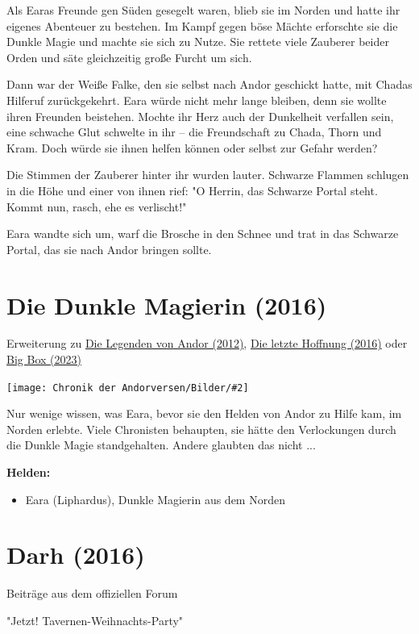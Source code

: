 \documentclass[10pt, a4paper, oneside]{book}
\newcommand{\fillbreak}{\vspace*{\fill}\columnbreak}
\newcommand{\produkt}[1]{%
    \section{#1}%
    \label{Produkt: #1}%
}
\newcommand{\storytext}[1]{%
    \section{#1}%
    \label{Storytext: #1}%
}
\newcommand{\refprodukt}[1]{\hyperref[Produkt: #1]{#1}}
\newcommand{\bildmitts}[2][height=0.32\textwidth,width=0.48\textwidth,keepaspectratio]{%
    \begin{center}
        \texttt{[image: Chronik der Andorversen/Bilder/\#2]}
    \end{center}
}
\begin{document}
\begin{multicols}{2}
Als Earas Freunde gen Süden gesegelt waren, blieb sie im Norden und hatte ihr eigenes Abenteuer zu bestehen. Im Kampf gegen böse Mächte erforschte sie die Dunkle Magie und machte sie sich zu Nutze. Sie rettete viele Zauberer beider Orden und säte gleichzeitig große Furcht um sich.

Dann war der Weiße Falke, den sie selbst nach Andor geschickt hatte, mit Chadas Hilferuf zurückgekehrt. Eara würde nicht mehr lange bleiben, denn sie wollte ihren Freunden beistehen. Mochte ihr Herz auch der Dunkelheit verfallen sein, eine schwache Glut schwelte in ihr – die Freundschaft zu Chada, Thorn und Kram. Doch würde sie ihnen helfen können oder selbst zur Gefahr werden?

Die Stimmen der Zauberer hinter ihr wurden lauter. Schwarze Flammen schlugen in die Höhe und einer von ihnen rief: "O Herrin, das Schwarze Portal steht. Kommt nun, rasch, ehe es verlischt!"

Eara wandte sich um, warf die Brosche in den Schnee und trat in das Schwarze Portal, das sie nach Andor bringen sollte.





\produkt{Die Dunkle Magierin (2016)}

\begin{center}
    Erweiterung zu \refprodukt{Die Legenden von Andor (2012)}, \refprodukt{Die letzte Hoffnung (2016)} oder \refprodukt{Big Box (2023)}
\end{center}

\bildmitts{Andor III Dunkle Eara.jpeg}

Nur wenige wissen, was Eara, bevor sie den Helden von Andor zu Hilfe kam, im Norden erlebte. Viele Chronisten behaupten, sie hätte den Verlockungen durch die Dunkle Magie standgehalten. Andere glaubten das nicht ... \bigskip

\textbf{Helden:} 

\begin{itemize}[topsep=0pt,itemsep=-1ex,partopsep=1ex,parsep=1ex]
    \item Eara (Liphardus), Dunkle Magierin aus dem Norden
\end{itemize}


\fillbreak

\storytext{Darh (2016)}

\begin{center}
    Beiträge aus dem offiziellen Forum

    "Jetzt! Tavernen-Weihnachts-Party"
\end{center}


\end{multicols}
\end{document}
